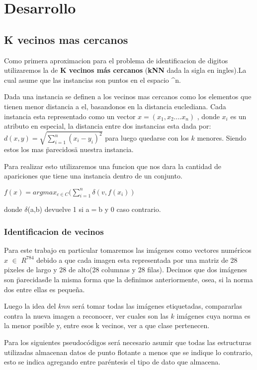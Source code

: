 \section{Desarrollo}
\subsection{K vecinos mas cercanos}
Como primera aproximacion para el problema de identificacion de digitos utilizaremos la de \textbf{K vecinos más cercanos} (\textbf{kNN} dada la sigla en ingles).La cual asume que las instancias son puntos en el espacio ^n.

Dada una instancia se definen a los vecinos mas cercanos como los elementos que tienen menor distancia a el, basandonos en la distancia euclediana. Cada instancia esta representado como un vector $x= (x_1,x_2....x_n)$ , donde $x_i$ es un atributo en especial, la distancia entre dos instancias esta dada por: $d(x,y) = \sqrt{\sum_{i=1}^{n} (x_i - y_i)^2}$ para luego quedarse con los $k$ menores. Siendo estos los mas \"parecidos\" a nuestra instancia.

Para realizar esto utilizaremos una funcion que nos dara la cantidad de apariciones que tiene una instancia dentro de un conjunto.

\begin{center}
$f(x)= argmax_{c \in C} (\sum_{i=1}^{n} \delta(v,f(x_i))$
\end{center}

donde $\delta$(a,b) devuelve 1 si a$=$b y 0 caso contrario. 

\subsubsection{Identificacion de vecinos}
Para este trabajo en particular tomaremos las imágenes como vectores numéricos $x$ $\in$ $R^{784}$ debido a que cada imagen esta representada por una matriz de 28 pixeles de largo y 28 de alto(28 columnas y 28 filas). 
Decimos que dos imágenes son \"parecidas\"  de la misma forma que la definimos anteriormente, osea, si la norma dos entre ellas es pequeña.

Luego la idea del $knn$ será tomar todas las imágenes etiquetadas, compararlas contra la nueva imagen a reconocer, ver cuales son las $k$ imágenes cuya norma es la menor posible y, entre esos k vecinos, ver a que clase pertenecen.

Para los siguientes pseudocódigos será necesario asumir que todas las estructuras utilizadas almacenan datos de punto flotante a menos que se indique lo contrario, esto se indica agregando entre paréntesis el tipo de dato que almacena.

